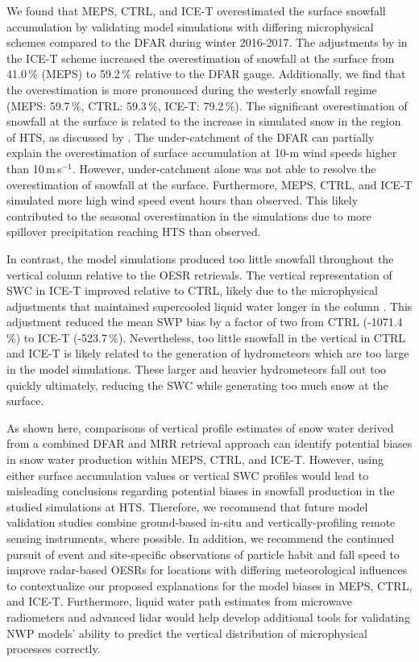 \documentclass{ametsocV5}
\begin{document}
	We found that MEPS, CTRL, and ICE-T overestimated the surface snowfall accumulation by validating model simulations with differing microphysical schemes compared to the DFAR during winter 2016-2017. The adjustments by \citet{engdahl_effects_2020} in the ICE-T scheme increased the overestimation of snowfall at the surface from 41.0\,\% (MEPS) to 59.2\,\% relative to the DFAR gauge. Additionally, we find that the overestimation is more pronounced during the westerly snowfall regime (MEPS: 59.7\,\%, CTRL: 59.3\,\%, ICE-T: 79.2\,\%). The significant overestimation of snowfall at the surface is related to the increase in simulated snow in the region of HTS, as discussed by \citet{engdahl_effects_2020}. The under-catchment of the DFAR can partially explain the overestimation of surface accumulation at 10-m wind speeds higher than 10\,m\,s$^{-1}$. However, under-catchment alone was not able to resolve the overestimation of snowfall at the surface. Furthermore, MEPS, CTRL, and ICE-T simulated more high wind speed event hours than observed. This likely contributed to the seasonal overestimation in the simulations due to more spillover precipitation reaching HTS than observed.

	In contrast, the model simulations produced too little snowfall throughout the vertical column relative to the OESR retrievals. The vertical representation of SWC in ICE-T improved relative to CTRL, likely due to the microphysical adjustments that maintained supercooled liquid water longer in the column \citep{engdahl_effects_2020}. This adjustment reduced the mean SWP bias by a factor of two from CTRL (-1071.4\,\%) to ICE-T (-523.7\,\%). 
	Nevertheless, too little snowfall in the vertical in CTRL and ICE-T is likely related to the generation of hydrometeors which are too large in the model simulations. 
	These larger and heavier hydrometeors fall out too quickly ultimately, reducing the SWC while generating too much snow at the surface.	

	As shown here, comparisons of vertical profile estimates of snow water derived from a combined DFAR and MRR retrieval approach can identify potential biases in snow water production within MEPS, CTRL, and ICE-T. However, using either surface accumulation values or vertical SWC profiles would lead to misleading conclusions regarding potential biases in snowfall production in the studied simulations at HTS. Therefore, we recommend that future model validation studies combine ground-based in-situ and vertically-profiling remote sensing instruments, where possible. In addition, we recommend the continued pursuit of event and site-specific observations of particle habit and fall speed to improve radar-based OESRs for locations with differing meteorological influences to contextualize our proposed explanations for the model biases in MEPS, CTRL, and ICE-T. Furthermore, liquid water path estimates from microwave radiometers and advanced lidar would help develop additional tools for validating NWP models' ability to predict the vertical distribution of microphysical processes correctly. 
	
\end{document}
